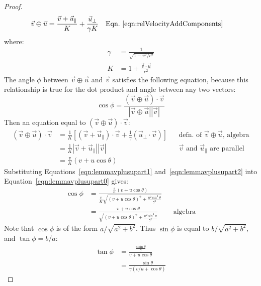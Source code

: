\documentclass[a4paper]{article}
\theoremstyle{plain}
\theoremstyle{definition}
\newcommand{\vect}[1]{\vec{#1}}
\begin{document}
\begin{proof}
\begin{align*}
\vect{v} \oplus \vect{u}
  & = \frac{ \vect{v} + \vect{u}_{\parallel} }{K} + \frac{\vect{u}_{\perp}}{\gamma K} & & \text{Eqn.~\eqref{eqn:relVelocityAddComponents}}
\end{align*}
where:
\begin{align*}
\gamma & = \frac{1}{\sqrt{1 - v^2/c^2}} \\
K & = 1 + \frac{\vect{v} \cdot \vect{u}}{c^2}
\end{align*}
The angle $\phi$ between $\vect{v} \oplus \vect{u}$ and $\vect{v}$
satisfies the following equation, because this relationship is true
for the dot product and angle between any two vectors:
\begin{equation}
\cos \phi = \frac{(\vect{v} \oplus \vect{u}) \cdot \vect{v}}{|\vect{v} \oplus \vect{u}| |\vect{v}|} \label{eqn:lemmavplusupart0}
\end{equation}
Then an equation equal to $(\vect{v} \oplus \vect{u}) \cdot \vect{v}$:
\begin{align}
(\vect{v} \oplus \vect{u}) \cdot \vect{v}
  & = \frac{1}{K} \left[ (\vect{v} + \vect{u}_{\parallel}) \cdot \vect{v} + \frac{1}{\gamma} (\vect{u}_{\perp} \cdot \vect{v}) \right] & & \text{defn. of $\vect{v} \oplus \vect{u}$, algebra} \nonumber \\
  & = \frac{1}{K} |\vect{v} + \vect{u}_{\parallel}| |\vect{v}| & & \text{$\vect{v}$ and $\vect{u}_{\parallel}$ are parallel} \nonumber \\
  & = \frac{v}{K} (v + u \cos \theta) \label{eqn:lemmavplusupart2}
\end{align}
Substituting Equations~\eqref{eqn:lemmavplusupart1}
and~\eqref{eqn:lemmavplusupart2}
into Equation~\eqref{eqn:lemmavplusupart0} gives:
\begin{align*}
\cos \phi
  & = \frac{ \frac{v}{K} (v + u \cos \theta) }{ \frac{v}{K} \sqrt{ (v + u \cos \theta)^2 + \frac{u^2 \sin^2 \theta}{\gamma^2} } } \\
  & = \frac{ v + u \cos \theta }{ \sqrt{ (v + u \cos \theta)^2 + \frac{u^2 \sin^2 \theta}{\gamma^2} } } & & \text{algebra}
\end{align*}
Note that $\cos \phi$ is of the form $a / \sqrt{a^2 + b^2}$.
Thus $\sin \phi$ is equal to $b/ \sqrt{a^2 + b^2}$,
and $\tan \phi = b/a$:
\begin{align}
\tan \phi
  & = \frac{ \frac{u \sin \theta}{\gamma} }{ v + u \cos \theta } \nonumber \\
  & = \frac{ \sin \theta }{ \gamma (v/u + \cos \theta) }
\end{align}
\end{proof}
\end{document}
